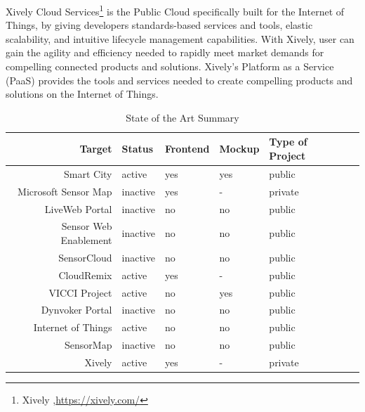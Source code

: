 \newline
    Xively Cloud Services\footnote{Xively ,\url{https://xively.com/}} is the Public Cloud specifically built for the Internet of Things, by giving developers standards-based services and tools, elastic scalability, and intuitive lifecycle management capabilities. With Xively, user can gain the agility and efficiency needed to rapidly meet market demands for compelling connected products and solutions. Xively’s Platform as a Service (PaaS) provides the tools and services needed to create compelling products and solutions on the Internet of Things.   
    \begin{table}[H]
	\centering
	\begin{tabular}{|r|l|l|l|l|l|}
	\hline
	Target 			       & Status & Frontend & Mockup & Type of Project \\
	\hline 
	\hline
	Smart City		       & active & yes & yes & public \\
	\hline
	Microsoft Sensor Map   & inactive & yes & - & private \\
	\hline
	LiveWeb Portal	       & inactive & no & no & public \\
	\hline
	Sensor Web Enablement  & inactive & no & no & public \\
	\hline
	SensorCloud		       & inactive & no & no & public \\
	\hline
	CloudRemix		       & active & yes & - & public \\
	\hline
	VICCI Project		   & active & no & yes & public \\
	\hline
	Dynvoker Portal		   & inactive & no & no & public \\
	\hline
	Internet of Things	   & active & no & no & public \\
	\hline
	SensorMap              & inactive & no & no & public \\
	\hline
	Xively                 & active & yes & - & private \\
	\hline
	\end{tabular}
	\caption[State of the Art]{State of the Art Summary}
	\label{tab:state_of_the_art}
	\end{table}


